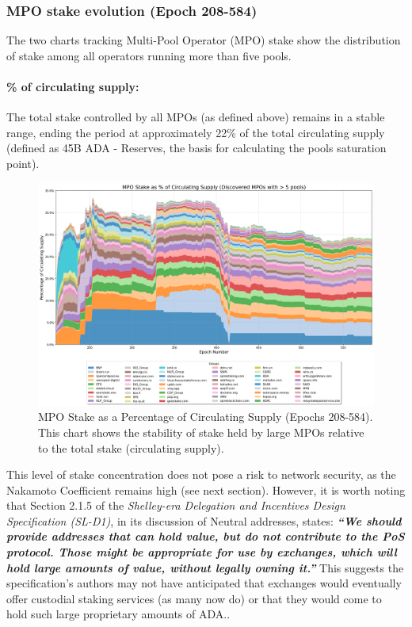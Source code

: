 \documentclass[11pt, letterpaper]{article}
\begin{document}
\newpage
\subsubsection{MPO stake evolution (Epoch 208-584)}

The two charts tracking Multi-Pool Operator (MPO) stake show the distribution
of stake among all operators running more than five pools.

\paragraph{\% of circulating supply:} The total stake controlled by all MPOs (as defined above)
remains in a stable range, ending the period at approximately 22\% of the total circulating
supply (defined as 45B ADA - Reserves, the basis for calculating the pools saturation point).

\begin{figure}[H]
	\centering
	\includegraphics[width=\textwidth, keepaspectratio]{img/mpo_evolution_pct_circulating}
	\caption{MPO Stake as a Percentage of Circulating Supply (Epochs 208-584). This chart shows
		the stability of stake held by large MPOs relative to the total stake (circulating supply).}
	\label{fig:mpo_circulating}
\end{figure}

This level of stake concentration does not pose a risk to network security, as the
Nakamoto Coefficient remains high (see next section). However, it is worth noting that
Section 2.1.5 of the \textit{Shelley-era Delegation and Incentives Design Specification (SL-D1)},
in its discussion of Neutral addresses, states: \textit{\textbf{``We should provide addresses that
		can hold value, but do not contribute to the PoS protocol. Those might be appropriate
		for use by exchanges, which will hold large amounts of value, without legally owning it.''}}
This suggests the specification's authors may not have anticipated that exchanges would eventually
offer custodial staking services (as many now do) or that they would come to hold such large
proprietary amounts of ADA.\@.
\end{document}
